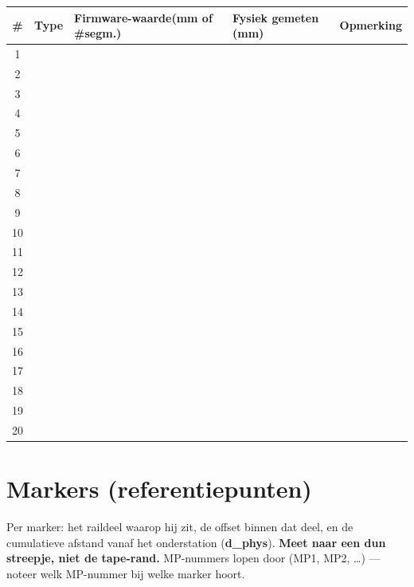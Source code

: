 \documentclass[10pt,a4paper]{article}
\begin{document}
\renewcommand{\arraystretch}{1.9}
\begin{tabular}{|c|p{3.0cm}|p{3.6cm}|p{2.6cm}|p{4.2cm}|}
\hline
\textbf{\#} & \textbf{Type} & \textbf{Firmware-waarde\newline (mm of \#segm.)} & \textbf{Fysiek gemeten (mm)} & \textbf{Opmerking} \\
\hline
1 & & & & \\ \hline
2 & & & & \\ \hline
3 & & & & \\ \hline
4 & & & & \\ \hline
5 & & & & \\ \hline
6 & & & & \\ \hline
7 & & & & \\ \hline
8 & & & & \\ \hline
9 & & & & \\ \hline
10 & & & & \\ \hline
11 & & & & \\ \hline
12 & & & & \\ \hline
13 & & & & \\ \hline
14 & & & & \\ \hline
15 & & & & \\ \hline
16 & & & & \\ \hline
17 & & & & \\ \hline
18 & & & & \\ \hline
19 & & & & \\ \hline
20 & & & & \\ \hline
\end{tabular}

\newpage

\section{Markers (referentiepunten)}
{\footnotesize Per marker: het raildeel waarop hij zit, de offset binnen dat deel, en de cumulatieve afstand vanaf het onderstation (\textbf{d\_phys}). \textbf{Meet naar een dun streepje, niet de tape-rand.} MP-nummers lopen door (MP1, MP2, \ldots) — noteer welk MP-nummer bij welke marker hoort.}
\end{document}
